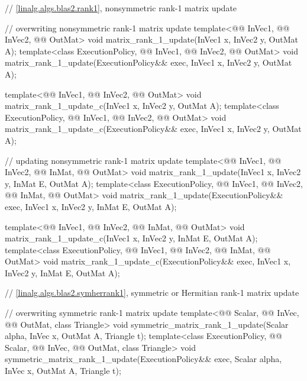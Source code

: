 \begin{codeblock}
{  // \ref{linalg.algs.blas2.rank1}, nonsymmetric rank-1 matrix update

  // overwriting nonsymmetric rank-1 matrix update
  template<@@ InVec1, @@ InVec2, @@ OutMat>
    void matrix_rank_1_update(InVec1 x, InVec2 y, OutMat A);
  template<class ExecutionPolicy, @@ InVec1, @@ InVec2, @@ OutMat>
    void matrix_rank_1_update(ExecutionPolicy&& exec, InVec1 x, InVec2 y, OutMat A);

  template<@@ InVec1, @@ InVec2, @@ OutMat>
    void matrix_rank_1_update_c(InVec1 x, InVec2 y, OutMat A);
  template<class ExecutionPolicy, @@ InVec1, @@ InVec2, @@ OutMat>
    void matrix_rank_1_update_c(ExecutionPolicy&& exec, InVec1 x, InVec2 y, OutMat A);

  // updating nonsymmetric rank-1 matrix update
  template<@@ InVec1, @@ InVec2, @@ InMat, @@ OutMat>
    void matrix_rank_1_update(InVec1 x, InVec2 y, InMat E, OutMat A);
  template<class ExecutionPolicy, @@ InVec1, @@ InVec2, @@ InMat,
           @@ OutMat>
    void matrix_rank_1_update(ExecutionPolicy&& exec,
                              InVec1 x, InVec2 y, InMat E, OutMat A);

  template<@@ InVec1, @@ InVec2, @@ InMat, @@ OutMat>
    void matrix_rank_1_update_c(InVec1 x, InVec2 y, InMat E, OutMat A);
  template<class ExecutionPolicy, @@ InVec1, @@ InVec2, @@ InMat,
           @@ OutMat>
    void matrix_rank_1_update_c(ExecutionPolicy&& exec,
                                InVec1 x, InVec2 y, InMat E, OutMat A);

  // \ref{linalg.algs.blas2.symherrank1}, symmetric or Hermitian rank-1 matrix update

  // overwriting symmetric rank-1 matrix update
  template<@@ Scalar, @@ InVec, @@ OutMat, class Triangle>
    void symmetric_matrix_rank_1_update(Scalar alpha, InVec x, OutMat A, Triangle t);
  template<class ExecutionPolicy,
           @@ Scalar, @@ InVec, @@ OutMat, class Triangle>
    void symmetric_matrix_rank_1_update(ExecutionPolicy&& exec,
                                        Scalar alpha, InVec x, OutMat A, Triangle t);

}
\end{codeblock}
